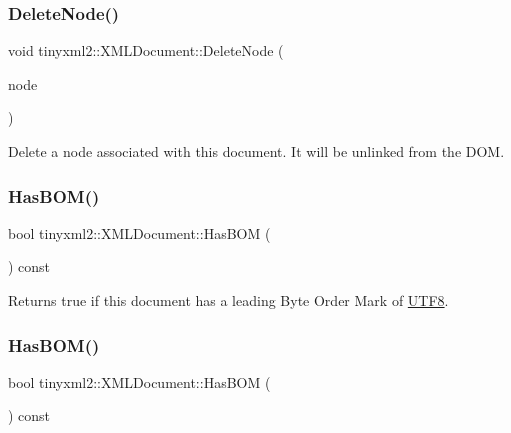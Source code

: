 \subsubsection{\texorpdfstring{Delete\+Node()}{DeleteNode()}\hspace{0.1cm}{\footnotesize\ttfamily [2/2]}}
{\footnotesize\ttfamily void tinyxml2\+::\+X\+M\+L\+Document\+::\+Delete\+Node (\begin{DoxyParamCaption}\item[{\hyperlink{classtinyxml2_1_1XMLNode}{X\+M\+L\+Node} $\ast$}]{node }\end{DoxyParamCaption})\hspace{0.3cm}{\ttfamily [inline]}}

Delete a node associated with this document. It will be unlinked from the D\+OM. \mbox{\label{classtinyxml2_1_1XMLDocument_a33fc5d159db873a179fa26338adb05bd}} 
\subsubsection{\texorpdfstring{Has\+B\+O\+M()}{HasBOM()}\hspace{0.1cm}{\footnotesize\ttfamily [1/2]}}
{\footnotesize\ttfamily bool tinyxml2\+::\+X\+M\+L\+Document\+::\+Has\+B\+OM (\begin{DoxyParamCaption}{ }\end{DoxyParamCaption}) const\hspace{0.3cm}{\ttfamily [inline]}}

Returns true if this document has a leading Byte Order Mark of \hyperlink{structUTF8}{U\+T\+F8}. \mbox{\label{classtinyxml2_1_1XMLDocument_a33fc5d159db873a179fa26338adb05bd}} 
\subsubsection{\texorpdfstring{Has\+B\+O\+M()}{HasBOM()}\hspace{0.1cm}{\footnotesize\ttfamily [2/2]}}
{\footnotesize\ttfamily bool tinyxml2\+::\+X\+M\+L\+Document\+::\+Has\+B\+OM (\begin{DoxyParamCaption}{ }\end{DoxyParamCaption}) const\hspace{0.3cm}{\ttfamily [inline]}}

